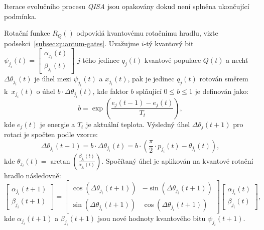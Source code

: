 Iterace evolučního procesu \emph{QISA} jsou opakovány dokud není splněna ukončující podmínka.

Rotační funkce $R_Q\left(\right)$ odpovídá kvantovému rotačnímu hradlu, vizte podsekci~\ref{subsec:quantum-gates}. 
Uvažujme $i$-tý kvantový bit $\psi_{j_i}\left(t\right) = \begin{bmatrix} \alpha_{j_i}\left(t\right) \\ \beta_{j_i}\left(t\right) \end{bmatrix}$ $j$-tého jedince $q_j\left(t\right)$ kvantové populace $Q\left(t\right)$ a nechť $\Delta\theta_{j_i}\left(t\right)$ je úhel mezi $\psi_{j_i}\left(t\right)$ a $x_{j_i}\left(t\right)$, pak je jedinec $q_j\left(t\right)$ rotován směrem k~$x_{j_i}\left(t\right)$ o úhel $b \cdot \Delta\theta_{j_i}\left(t\right)$, kde faktor $b$ splňující $0 \leq b \leq 1$ je definován jako:
\begin{equation}\label{eq:b-factor}
    b = \exp\left(\frac{e_j\left(t-1\right) - e_j\left(t\right)}{T_t}\right), 
\end{equation}
kde $e_j\left(t\right)$ je energie a $T_t$ je aktuální teplota. Výsledný úhel $\Delta\theta_j\left(t+1\right)$ pro rotaci je spočten podle vzorce:
\begin{equation*}
        \Delta\theta_{j_i}\left(t+1\right) = b \cdot \Delta\theta_{j_i}\left(t\right) = b \cdot \left(\frac{\pi}{2}\cdot p_{j_i}\left(t\right) - \theta_{j_i}\left(t\right)\right),
\end{equation*}
kde $\theta_{j_i}\left(t\right) = \arctan{\left(\frac{\beta_{j_i}\left(t\right)}{\alpha_{j_i}\left(t\right)}\right)}$. 
Spočítaný úhel je aplikován na kvantové rotační hradlo následovně:
\begin{equation*}
    \begin{bmatrix}
        \alpha_{j_i}\left(t+1\right) \\
        \beta_{j_i}\left(t+1\right)
    \end{bmatrix}
    =
    \begin{bmatrix}
        \cos{\left( \Delta\theta_{j_i}\left(t+1\right) \right)} & - \sin{\left( \Delta\theta_{j_i}\left(t+1\right) \right)} \\
        \sin{\left( \Delta\theta_{j_i}\left(t+1\right) \right)} &   \cos{\left( \Delta\theta_{j_i}\left(t+1\right) \right)}
    \end{bmatrix}
    \begin{bmatrix}
        \alpha_{j_i}\left(t\right) \\
        \beta_{j_i}\left(t\right) 
    \end{bmatrix},
\end{equation*}
kde $\alpha_{j_i}\left(t+1\right)$ a $\beta_{j_i}\left(t+1\right)$ jsou nové hodnoty kvantového bitu $\psi_{j_i}\left(t+1\right)$.

